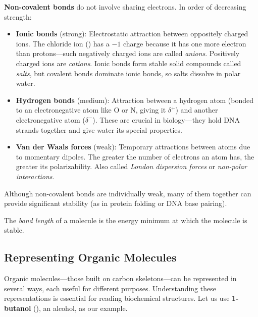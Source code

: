 \documentclass{report}
\begin{document}
\textbf{Non-covalent bonds} do not involve sharing electrons. In order of decreasing strength:
\begin{itemize}
    \item \textbf{Ionic bonds} (strong): Electrostatic attraction between oppositely charged ions. The chloride ion () has a \(-1\) charge because it has one more electron than protons---such negatively charged ions are called \emph{anions}. Positively charged ions are \emph{cations}. Ionic bonds form stable solid compounds called \emph{salts}, but covalent bonds dominate ionic bonds, so salts dissolve in polar water.
    \item \textbf{Hydrogen bonds} (medium): Attraction between a hydrogen atom (bonded to an electronegative atom like O or N, giving it \(\delta^{+}\)) and another electronegative atom (\(\delta^{-}\)). These are crucial in biology---they hold DNA strands together and give water its special properties.
    \item \textbf{Van der Waals forces} (weak): Temporary attractions between atoms due to momentary dipoles. The greater the number of electrons an atom has, the greater its polarizability. Also called \emph{London dispersion forces} or \emph{non-polar interactions}.
\end{itemize}

Although non-covalent bonds are individually weak, many of them together can provide significant stability (as in protein folding or DNA base pairing). 


The \emph{bond length} of a molecule is the energy minimum at which the molecule is stable. 


\subsection{Representing Organic Molecules}

Organic molecules---those built on carbon skeletons---can be represented in several ways, each useful for different purposes. Understanding these representations is essential for reading biochemical structures. Let us use \textbf{1-butanol} (), an alcohol, as our example.
\end{document}
